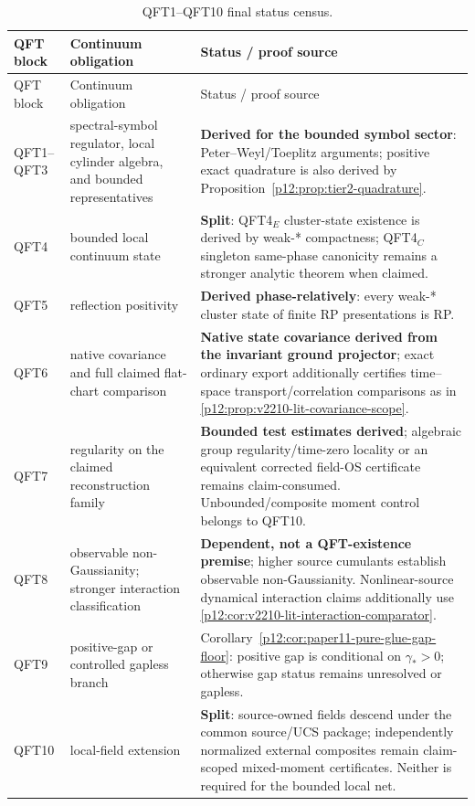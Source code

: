 \documentclass[12pt,a4paper]{article}
\begin{document}
\begin{longtable}{>{\raggedright\arraybackslash}p{} >{\raggedright\arraybackslash}p{} >{\raggedright\arraybackslash}p{}}
\caption[QFT1--QFT10 final status census]{QFT1--QFT10 final status census.}\label{p12:tab:qft1-qft10-final-discharge-census}\\
\toprule
QFT block & Continuum obligation & Status / proof source \\
\midrule
\endfirsthead
\toprule
QFT block & Continuum obligation & Status / proof source \\
\midrule
\endhead
QFT1--QFT3 & spectral-symbol regulator, local cylinder algebra, and bounded representatives & \textbf{Derived for the bounded symbol sector}: Peter--Weyl/Toeplitz arguments; positive exact quadrature is also derived by Proposition~\ref{p12:prop:tier2-quadrature}. \\
QFT4 & bounded local continuum state & \textbf{Split}: QFT4$_E$ cluster-state existence is derived by weak-* compactness; QFT4$_C$ singleton same-phase canonicity remains a stronger analytic theorem when claimed. \\
QFT5 & reflection positivity & \textbf{Derived phase-relatively}: every weak-* cluster state of finite RP presentations is RP. \\
QFT6 & native covariance and full claimed flat-chart comparison & \textbf{Native state covariance derived from the invariant ground projector}; exact ordinary export additionally certifies time--space transport/correlation comparisons as in \ref{p12:prop:v2210-lit-covariance-scope}. \\
QFT7 & regularity on the claimed reconstruction family & \textbf{Bounded test estimates derived}; algebraic group regularity/time-zero locality or an equivalent corrected field-OS certificate remains claim-consumed. Unbounded/composite moment control belongs to QFT10. \\
QFT8 & observable non-Gaussianity; stronger interaction classification & \textbf{Dependent, not a QFT-existence premise}; higher source cumulants establish observable non-Gaussianity. Nonlinear-source dynamical interaction claims additionally use \ref{p12:cor:v2210-lit-interaction-comparator}. \\
QFT9 & positive-gap or controlled gapless branch & Corollary~\ref{p12:cor:paper11-pure-glue-gap-floor}: positive gap is conditional on \(\gamma_*>0\); otherwise gap status remains unresolved or gapless. \\
QFT10 & local-field extension & \textbf{Split}: source-owned fields descend under the common source/UCS package; independently normalized external composites remain claim-scoped mixed-moment certificates.  Neither is required for the bounded local net. \\
\bottomrule
\end{longtable}
\end{document}
